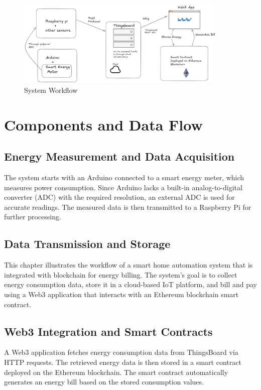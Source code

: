 \documentclass[a4paper,12pt]{report}
\begin{document}
\begin{figure}[h]
    \centering
    \includegraphics[width=0.9\textwidth]{basicArchitecture.png}
    \caption{System Workflow}
    \label{fig:workflow}
\end{figure}

\section{Components and Data Flow}

\subsection{Energy Measurement and Data Acquisition}

The system starts with an Arduino connected to a smart energy meter, which measures power consumption. Since Arduino lacks a built-in analog-to-digital converter (ADC) with the required resolution, an external ADC is used for accurate readings. The measured data is then transmitted to a Raspberry Pi for further processing.

\subsection{Data Transmission and Storage}

This chapter illustrates the workflow of a smart home automation system that is integrated with blockchain for energy billing.  The system's goal is to collect energy consumption data, store it in a cloud-based IoT platform, and bill and pay using a Web3 application that interacts with an Ethereum blockchain smart contract.

\subsection{Web3 Integration and Smart Contracts}

A Web3 application fetches energy consumption data from ThingsBoard via HTTP requests. The retrieved energy data is then stored in a smart contract deployed on the Ethereum blockchain. The smart contract automatically generates an energy bill based on the stored consumption values.
\end{document}
